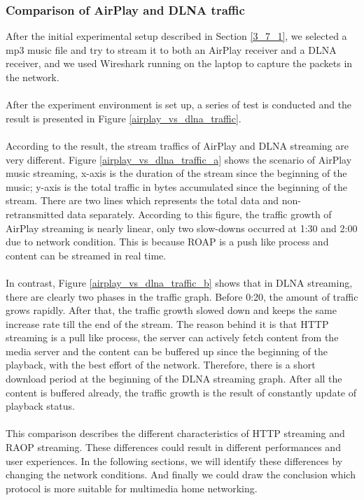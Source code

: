 \subsubsection{Comparison of AirPlay and DLNA traffic\label{4_1_1}}
After the initial experimental setup described in Section \ref{3_7_1}, we selected a mp3 music file and try to stream it to both an AirPlay receiver and a DLNA receiver, and we used Wireshark running on the laptop to capture the packets in the network.\\
\\
After the experiment environment is set up, a series of test is conducted and the result is presented in Figure \ref{airplay_vs_dlna_traffic}.\\
\\
According to the result, the stream traffics of AirPlay and DLNA streaming are very different. Figure \ref{airplay_vs_dlna_traffic_a} shows the scenario of AirPlay music streaming, x-axis is the duration of the stream since the beginning of the music; y-axis is the
total traffic in bytes accumulated since the beginning of the stream. There are two lines which represents the total data and non-retransmitted data separately. According to this figure, the
traffic growth of AirPlay streaming is nearly linear, only two slow-downs occurred at 1:30 and 2:00 due to network condition. This is because ROAP is a push like process and content can be streamed in real time.\\
\\
In contrast, Figure \ref{airplay_vs_dlna_traffic_b} shows that in DLNA streaming, there are clearly two phases in the traffic graph. Before 0:20, the amount of traffic grows rapidly. After that, the traffic growth slowed down and keeps the same increase rate till the end of the stream. The reason behind it is that HTTP streaming is a pull like process, the server can actively fetch content from the media server and the content can be buffered up since the beginning of the playback, with the best effort of the network. Therefore, there is a short download period at the beginning of the DLNA streaming graph. After all the content is buffered already, the traffic growth is the result of constantly update of playback status.\\
\\
This comparison describes the different characteristics of HTTP streaming and RAOP streaming. These differences could result in different performances and user experiences. In the following sections, we will identify these differences by changing the network conditions. And finally we could draw the conclusion which protocol is more suitable for multimedia home networking.
